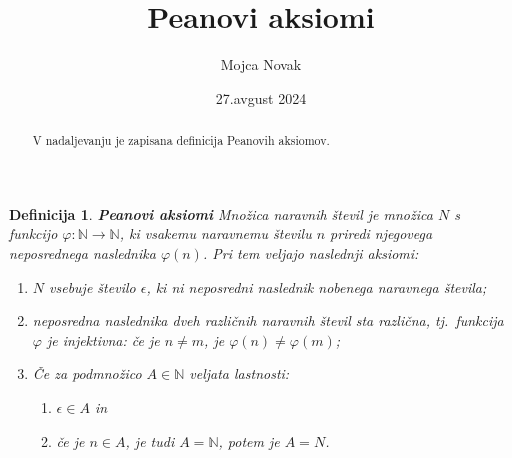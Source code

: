 \documentclass[a4paper, 11pt]{article}
\title{Peanovi aksiomi}
\author{Mojca Novak}
\date{27.avgust 2024}
\newcommand{\N}{\mathbb{N}}
\newtheorem{definicija}{Definicija}}
\begin{document}
\maketitle

        
        \begin{abstract}
            V nadaljevanju je zapisana definicija Peanovih aksiomov.
        \end{abstract}

        
        \begin{definicija}
            \textbf{Peanovi aksiomi} \cite{zapiski}
            Množica naravnih števil je množica $N$ s funkcijo $\varphi : \N \rightarrow \N$, 
            ki vsakemu naravnemu številu $n$ priredi njegovega neposrednega naslednika $\varphi(n)$. 
            Pri tem veljajo naslednji aksiomi:
            \begin{enumerate}
                \item $N$ vsebuje število $\epsilon$, ki ni neposredni naslednik nobenega naravnega števila;
                \item neposredna naslednika dveh različnih naravnih števil sta različna, tj.\ funkcija $\varphi$ je injektivna: 
                če je $n \neq m$, je $\varphi(n) \neq \varphi(m)$;
                \item Če za podmnožico $A \in \N$ veljata lastnosti:
                \begin{enumerate}
                    \item $\epsilon \in A$ in
                    \item če je $n \in A$, je tudi $A = \N$,
                    potem je $A = N$.
                \end{enumerate}
            \end{enumerate}
        \end{definicija}

        
        
        
    
\end{document}
